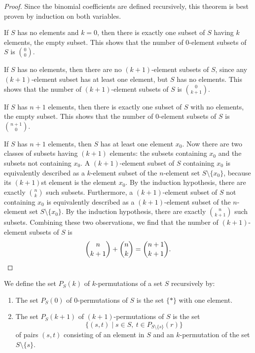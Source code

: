 \begin{proof}
  Since the binomial coefficients are defined recursively, this theorem is best proven by induction on both variables.

  If \(S\) has no elements and \(k=0\), then there is exactly one subset of \(S\) having \(k\) elements, the empty subset. This shows that the number of \(0\)-element subsets of \(S\) is \(\binom{0}{0}\).

  If \(S\) has no elements, then there are no \((k+1)\)-element subsets of \(S\), since any \((k+1)\)-element subset has at least one element, but \(S\) has no elements. This shows that the number of \((k+1)\)-element subsets of \(S\) is \(\binom{0}{k+1}\).

  If \(S\) has \(n+1\) elements, then there is exactly one subset of \(S\) with no elements, the empty subset. This shows that the number of \(0\)-element subsets of \(S\) is \(\binom{n+1}{0}\).

  If \(S\) has \(n+1\) elements, then \(S\) has at least one element \(x_0\). Now there are two classes of subsets having \((k+1)\) elements: the subsets containing \(x_0\) and the subsets not containing \(x_0\). A \((k+1)\)-element subset of \(S\) containing \(x_0\) is equivalently described as a \(k\)-element subset of the \(n\)-element set \(S\setminus\{x_0\}\), because its \((k+1)\)st element is the element \(x_0\). By the induction hypothesis, there are exactly \(\binom{n}{k}\) such subsets. Furthermore, a \((k+1)\)-element subset of \(S\) not containing \(x_0\) is equivalently described as a \((k+1)\)-element subset of the \(n\)-element set \(S\setminus\{x_0\}\). By the induction hypothesis, there are exactly \(\binom{n}{k+1}\) such subsets. Combining these two observations, we find that the number of \((k+1)\)-element subsets of \(S\) is
  \begin{equation*}
    \binom{n}{k+1} + \binom{n}{k} = \binom{n+1}{k+1}.\qedhere
  \end{equation*}
\end{proof}

\begin{definition}
  We define the set $P_S(k)$ of $k$-permutations of a set $S$ recursively by:
  \begin{enumerate}
  \item The set $P_S(0)$ of $0$-permutations of $S$ is the set $\{\ast\}$ with one element.
  \item The set $P_S(k+1)$ of $(k+1)$-permutations of $S$ is the set
    \begin{equation*}
      \{(s,t) \mid s\in S,\ t\in P_{S\setminus\{s\}}(r)\}
    \end{equation*}
    of pairs $(s,t)$ consisting of an element in $S$ and an $k$-permutation of the set $S\setminus\{s\}$.
  \end{enumerate}
\end{definition}

